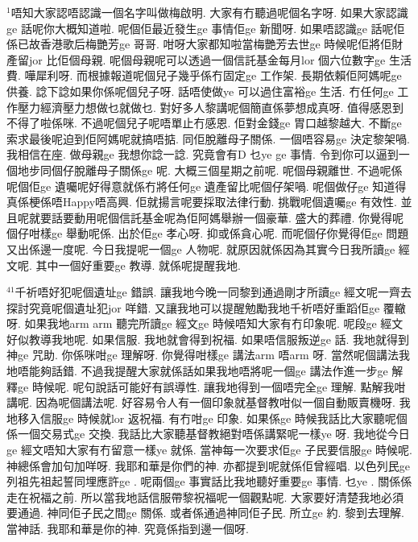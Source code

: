 \documentclass{book}
\begin{document}
$^{1}$唔知大家認唔認識一個名字叫做梅啟明.
大家有冇聽過呢個名字呀.
如果大家認識ge 話呢你大概知道啦.
呢個佢最近發生ge 事情佢ge 新聞呀.
如果唔認識ge 話呢佢係已故香港歌后梅艷芳ge 哥哥.
咁呀大家都知啦當梅艷芳去世ge 時候呢佢將佢財產留jor 比佢個母親.
呢個母親呢可以透過一個信託基金每月lor 個六位數字ge 生活費.
嘩犀利呀.
而根據報道呢個兒子幾乎係冇固定ge 工作架.
長期依賴佢阿媽呢ge 供養.
諗下諗如果你係呢個兒子呀.
話唔使做ye 可以過住富裕ge 生活.
冇任何ge 工作壓力經濟壓力想做乜就做乜.
對好多人黎講呢個簡直係夢想成真呀.
值得感恩到不得了啦係咪.
不過呢個兒子呢唔單止冇感恩.
佢對金錢ge 胃口越黎越大.
不斷ge 索求最後呢迫到佢阿媽呢就搞唔掂.
同佢脫離母子關係.
一個唔容易ge 決定黎架喎.
我相信在座.
做母親ge 我想你諗一諗.
究竟會有D 乜ye ge 事情.
令到你可以逼到一個地步同個仔脫離母子關係ge 呢.
大概三個星期之前呢.
呢個母親離世.
不過呢係呢個佢ge 遺囑呢好得意就係冇將任何ge 遺產留比呢個仔架喎.
呢個做仔ge 知道得真係梗係唔Happy唔高興.
佢就揚言呢要採取法律行動.
挑戰呢個遺囑ge 有效性.
並且呢就要話要動用呢個信託基金呢為佢阿媽舉辦一個豪華.
盛大的葬禮.
你覺得呢個仔咁樣ge 舉動呢係.
出於佢ge 孝心呀.
抑或係貪心呢.
而呢個仔你覺得佢ge 問題又出係邊一度呢.
今日我提呢一個ge 人物呢.
就原因就係因為其實今日我所讀ge 經文呢.
其中一個好重要ge 教導.
就係呢提醒我地.

$^{41}$千祈唔好犯呢個遺址ge 錯誤.
讓我地今晚一同黎到通過剛才所讀ge 經文呢一齊去探討究竟呢個遺址犯jor 咩錯.
又讓我地可以提醒勉勵我地千祈唔好重蹈佢ge 覆轍呀.
如果我地arm arm 聽完所讀ge 經文ge 時候唔知大家有冇印象呢.
呢段ge 經文好似教導我地呢.
如果信服.
我地就會得到祝福.
如果唔信服叛逆ge 話.
我地就得到神ge 咒助.
你係咪咁ge 理解呀.
你覺得咁樣ge 講法arm 唔arm 呀.
當然呢個講法我地唔能夠話錯.
不過我提醒大家就係話如果我地唔將呢一個ge 講法作進一步ge 解釋ge 時候呢.
呢句說話可能好有誤導性.
讓我地得到一個唔完全ge 理解.
點解我咁講呢.
因為呢個講法呢.
好容易令人有一個印象就基督教咁似一個自動販賣機呀.
我地移入信服ge 時候就lor 返祝福.
有冇咁ge 印象.
如果係ge 時候我話比大家聽呢個係一個交易式ge 交換.
我話比大家聽基督教絕對唔係講緊呢一樣ye 呀.
我地從今日ge 經文唔知大家有冇留意一樣ye 就係.
當神每一次要求佢ge 子民要信服ge 時候呢.
神總係會加句加咩呀.
我耶和華是你們的神.
亦都提到呢就係佢曾經唱.
以色列民ge 列祖先祖起誓同埋應許ge .
呢兩個ge 事實話比我地聽好重要ge 事情.
乜ye .
關係係走在祝福之前.
所以當我地話信服帶黎祝福呢一個觀點呢.
大家要好清楚我地必須要通過.
神同佢子民之間ge 關係.
或者係通過神同佢子民.
所立ge 約.
黎到去理解.
當神話.
我耶和華是你的神.
究竟係指到邊一個呀.
\end{document}

